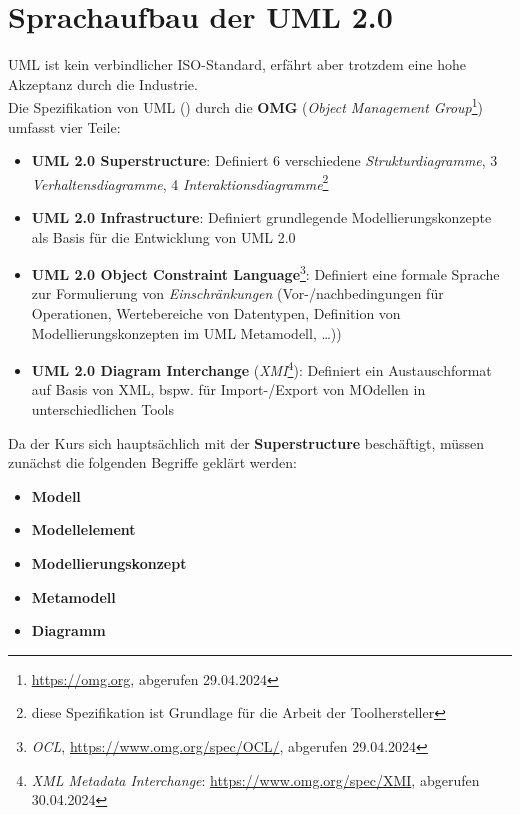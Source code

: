 \section{Sprachaufbau der UML 2.0}

UML ist kein verbindlicher ISO-Standard, erfährt aber trotzdem eine hohe Akzeptanz durch die Industrie.\\

Die Spezifikation von UML (\cite{UML17}) durch die \textbf{OMG} (\textit{Object Management Group}\footnote{
    \url{https://omg.org}, abgerufen 29.04.2024
}) umfasst vier Teile:

\begin{itemize}
    \item \textbf{UML 2.0 Superstructure}: Definiert 6 verschiedene \textit{Strukturdiagramme}, 3 \textit{Verhaltensdiagramme}, 4 \textit{Interaktionsdiagramme}\footnote{
    diese Spezifikation ist Grundlage für die Arbeit der Toolhersteller
    }
    \item \textbf{UML 2.0 Infrastructure}: Definiert grundlegende Modellierungskonzepte als Basis für die Entwicklung von UML 2.0
    \item \textbf{UML 2.0 Object Constraint Language}\footnote{
    \textit{OCL}, \url{https://www.omg.org/spec/OCL/}, abgerufen 29.04.2024
    }: Definiert eine formale Sprache zur Formulierung von \textit{Einschränkungen} (Vor-/nachbedingungen für Operationen, Wertebereiche von Datentypen, Definition von Modellierungskonzepten im UML Metamodell, \ldots))
    \item \textbf{UML 2.0 Diagram Interchange} (\textit{XMI}\footnote{
    \textit{XML Metadata Interchange}: \url{https://www.omg.org/spec/XMI}, abgerufen 30.04.2024
    }): Definiert ein Austauschformat auf Basis von XML, bspw. für Import-/Export von MOdellen in unterschiedlichen Tools
\end{itemize}


\noindent
Da der Kurs sich hauptsächlich mit der \textbf{Superstructure} beschäftigt, müssen zunächst die folgenden Begriffe geklärt werden:

\begin{itemize}
    \item \textbf{Modell}
    \item \textbf{Modellelement}
    \item \textbf{Modellierungskonzept}
    \item \textbf{Metamodell}
    \item \textbf{Diagramm}
\end{itemize}

